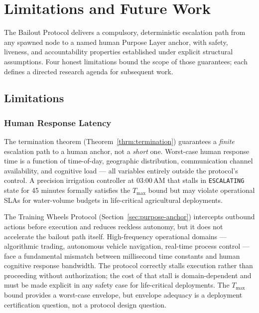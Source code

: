 \section{Limitations and Future Work}
\label{sec:limitations-and-future-work}

The Bailout Protocol delivers a compulsory, deterministic escalation path from any spawned node to a named human Purpose Layer anchor, with safety, liveness, and accountability properties established under explicit structural assumptions. Four honest limitations bound the scope of those guarantees; each defines a directed research agenda for subsequent work.

\subsection{Limitations}
\label{sec:limitations}

\subsubsection{Human Response Latency}
\label{sec:lim-latency}

The termination theorem (Theorem~\ref{thrm:termination}) guarantees a \emph{finite} escalation path to a human anchor, not a \emph{short} one. Worst-case human response time is a function of time-of-day, geographic distribution, communication channel availability, and cognitive load --- all variables entirely outside the protocol's control. A precision irrigation controller at 03:00\,AM that stalls in \texttt{ESCALATING} state for 45 minutes formally satisfies the $T_{\max}$ bound but may violate operational SLAs for water-volume budgets in life-critical agricultural deployments.

The Training Wheels Protocol (Section~\ref{sec:purpose-anchor}) intercepts outbound actions before execution and reduces reckless autonomy, but it does not accelerate the bailout path itself. High-frequency operational domains --- algorithmic trading, autonomous vehicle navigation, real-time process control --- face a fundamental mismatch between millisecond time constants and human cognitive response bandwidth. The protocol correctly stalls execution rather than proceeding without authorization; the cost of that stall is domain-dependent and must be made explicit in any safety case for life-critical deployments. The $T_{\max}$ bound provides a worst-case envelope, but envelope adequacy is a deployment certification question, not a protocol design question.

